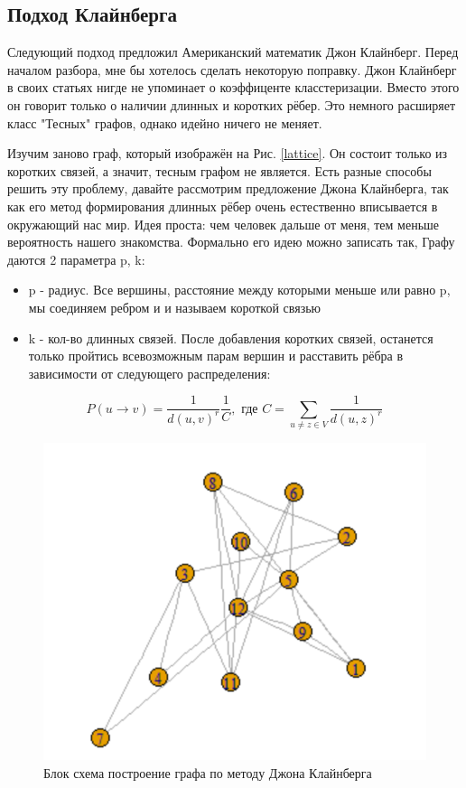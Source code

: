 \subsection{Подход Клайнберга}

    Следующий подход предложил Американский математик Джон Клайнберг. Перед началом разбора,
мне бы хотелось сделать некоторую поправку. Джон Клайнберг в своих статьях нигде не 
упоминает о коэффиценте класстеризации. Вместо этого он говорит только о наличии длинных
и коротких рёбер. Это немного расширяет класс "Тесных" графов, однако идейно 
ничего не меняет.

    Изучим заново граф, который изображён на Рис. \ref{lattice}. Он состоит только из
коротких связей, а значит, тесным графом не является. Есть разные способы решить эту проблему,
давайте рассмотрим предложение Джона Клайнберга, так как его метод формирования длинных
рёбер очень естественно вписывается в окружающий нас мир. Идея проста: чем человек дальше от меня, тем меньше
вероятность нашего знакомства. Формально его идею можно записать так, 
Графу даются 2 параметра p, k:
\begin{itemize}
    \item p - радиус. Все вершины, расстояние между которыми меньше или равно p, мы соединяем ребром и 
    и называем короткой связью
    \item k - кол-во длинных связей. После добавления коротких связей, останется только пройтись всевозможным 
    парам вершин и расставить рёбра в зависимости от следующего распределения:
\end{itemize}

\begin{equation} \label{edges_distribution}
    P(u \rightarrow v) = \frac{1}{d(u, v)^r}\frac{1}{C}, \text{ где } C = \sum_{u \neq z \in V}\frac{1}{d(u, z)^r}
\end{equation}


\begin{figure}[H]
    \centering
    \includegraphics[scale=0.3]{./pictures/random_graph.png}
    \caption{Блок схема построение графа по методу Джона Клайнберга} \label{Kleinberg_graph_block_scheme}
\end{figure}

